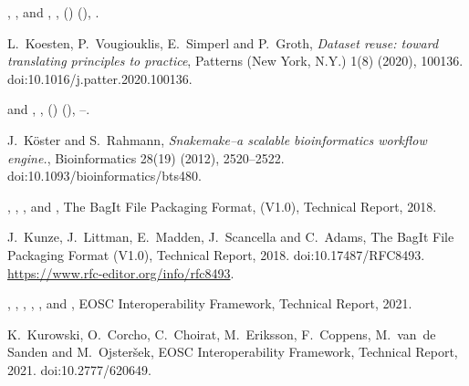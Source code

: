 \documentclass[ds,v1.1.2,openaccess]{iosart2x}%
\begin{document}
\begin{thebibliography}{}
%
\begin{barticle}
,
,
 and
,
,
()
(),
.
\end{barticle}
%
\OrigBibText
L.~Koesten,
P.~Vougiouklis,
E.~Simperl and
P.~Groth,
\textit{Dataset reuse: toward translating principles to practice},
Patterns (New York, N.Y.)
1(8)
(2020),
100136.
doi:10.1016/j.patter.2020.100136.
\endOrigBibText
{}
\endbibitem

%
\begin{barticle}
 and
,
,
()
(),
--.
\end{barticle}
%
\OrigBibText
J.~K\"{o}ster and
S.~Rahmann,
\textit{Snakemake--a scalable bioinformatics workflow engine.},
Bioinformatics
28(19)
(2012),
2520--2522.
doi:10.1093/bioinformatics/bts480.
\endOrigBibText
{}
\endbibitem

%
\begin{botherref}
,
,
,
 and
,
The {BagIt} File Packaging Format,
(V1.0), Technical Report,
2018.
\end{botherref}
%
\OrigBibText
J.~Kunze,
J.~Littman,
E.~Madden,
J.~Scancella and
C.~Adams,
The {BagIt} File Packaging Format (V1.0),
Technical Report,
2018.
doi:10.17487/RFC8493.
\url{https://www.rfc-editor.org/info/rfc8493}.
\endOrigBibText
{}
\endbibitem

%
\begin{botherref}
,
,
,
,
,
 and
,
{EOSC} Interoperability Framework, Technical Report,
2021.
\end{botherref}
%
\OrigBibText
K.~Kurowski,
O.~Corcho,
C.~Choirat,
M.~Eriksson,
F.~Coppens,
M.~van~de Sanden and
M.~Ojster\v{s}ek,
{EOSC} Interoperability Framework,
Technical Report,
2021.
doi:10.2777/620649.
\endOrigBibText
{}
\endbibitem


\end{thebibliography}
\end{document}
